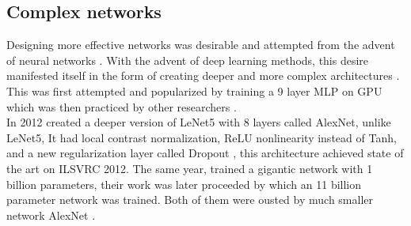 \documentclass{article} \usepackage{lets_keepit_simple,times}
\begin{document}
\subsection{Complex networks}
Designing more effective networks was desirable and attempted from the advent of neural networks \cite{Fukushima_Neocognitron_Beginning_1979, Fukushima_Neocognitron_Self_Orgenizing_NN_1980, Ivankhnenko_Polynomial_theory_1971}. With the advent of deep learning methods, this desire manifested itself in the form of creating deeper and more complex architectures \cite{Ciresan_Deep_big_simple_nn_2010, Ciresan_A_committee_of_nn_2011, Ciresan_Multi_colmn_dnn_traffic_sign_2012, He_ResNet_2015, AlexKrizhevsky_imgnet_2012, Simonyan_VGG_2014, Srivastava_HighwayNets_2015, Szegedy_googlenet_2015, Zagoruyko_WRN_2016}. This was first attempted and popularized by \cite{Ciresan_Deep_big_simple_nn_2010} training a 9 layer MLP on GPU which was then practiced by other researchers \cite{ Ciresan_A_committee_of_nn_2011, Ciresan_Multi_colmn_dnn_traffic_sign_2012, Ciregan_Multi_column_dnn_img_cls_2012, He_ResNet_2015, AlexKrizhevsky_imgnet_2012, Simonyan_VGG_2014, Srivastava_HighwayNets_2015, Szegedy_googlenet_2015, Zagoruyko_WRN_2016}.\\
In 2012 \cite{AlexKrizhevsky_imgnet_2012} created a deeper version of LeNet5 \cite{Lecun_GradientBased_CNN_1998} with 8 layers called AlexNet, unlike LeNet5, It had local contrast normalization, ReLU \cite{Nair_ReLU_RBM_2010} nonlinearity instead of Tanh, and a new regularization layer called Dropout \cite{Hinton_preventingCoAdapt_2012}, this architecture achieved state of the art on ILSVRC 2012. The same year, \cite{Le_Building_HighlevelFeats_2013} trained a gigantic network with 1 billion parameters, their work was later proceeded by \cite{Coates_deepLearning_COTS_HPC_2013} which an 11 billion parameter network was trained. Both of them were ousted by much smaller network AlexNet  \cite{AlexKrizhevsky_imgnet_2012}.\\
\end{document}
